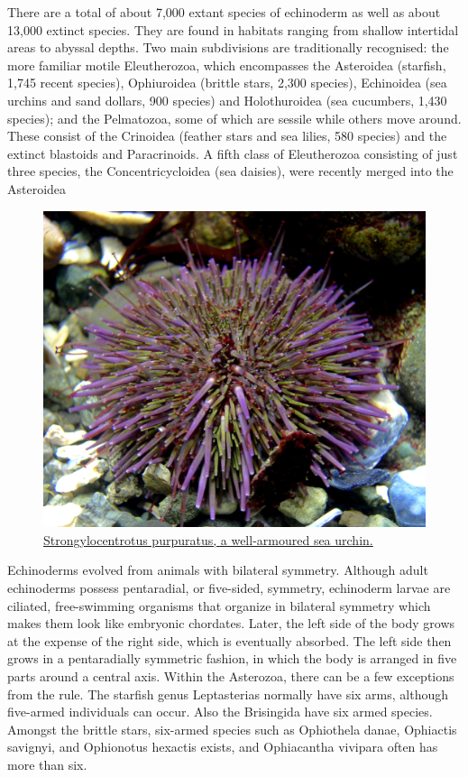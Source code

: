 There are a total of about 7,000 extant species of echinoderm as well as about 13,000 extinct species. They are found in habitats ranging from shallow intertidal areas to abyssal depths. Two main subdivisions are traditionally recognised: the more familiar motile Eleutherozoa, which encompasses the Asteroidea (starfish, 1,745 recent species), Ophiuroidea (brittle stars, 2,300 species), Echinoidea (sea urchins and sand dollars, 900 species) and Holothuroidea (sea cucumbers, 1,430 species); and the Pelmatozoa, some of which are sessile while others move around. These consist of the Crinoidea (feather stars and sea lilies, 580 species) and the extinct blastoids and Paracrinoids. A fifth class of Eleutherozoa consisting of just three species, the Concentricycloidea (sea daisies), were recently merged into the Asteroidea



\begin{figure}

{\centering \includegraphics[width=0.7\linewidth]{./figures/animals/Strongylocentrotus_purpuratus_1} 

}

\caption{\href{https://commons.wikimedia.org/wiki/File:Strongylocentrotus_purpuratus_1.jpg}{Strongylocentrotus purpuratus, a well-armoured sea urchin.}}\label{fig:seaurchin}
\end{figure}

Echinoderms evolved from animals with bilateral symmetry. Although adult echinoderms possess pentaradial, or five-sided, symmetry, echinoderm larvae are ciliated, free-swimming organisms that organize in bilateral symmetry which makes them look like embryonic chordates. Later, the left side of the body grows at the expense of the right side, which is eventually absorbed. The left side then grows in a pentaradially symmetric fashion, in which the body is arranged in five parts around a central axis. Within the Asterozoa, there can be a few exceptions from the rule. The starfish genus Leptasterias normally have six arms, although five-armed individuals can occur. Also the Brisingida have six armed species. Amongst the brittle stars, six-armed species such as Ophiothela danae, Ophiactis savignyi, and Ophionotus hexactis exists, and Ophiacantha vivipara often has more than six.

